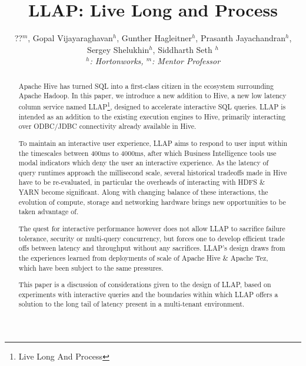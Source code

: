 \documentclass{vldb}
\begin{document}
\title{LLAP: Live Long and Process}

\author{
\alignauthor
??$^m$, Gopal Vijayaraghavan$^h$, Gunther Hagleitner$^h$, Prasanth Jayachandran$^h$, \\ 
Sergey Shelukhin$^h$, Siddharth Seth $^h$
\\
{\large \emph{$^h$: Hortonworks, $^m$: Mentor Professor}}
}

\maketitle

\begin{abstract}
Apache Hive has turned SQL into a first-class citizen in the ecosystem surrounding Apache Hadoop.
In this paper, we introduce a new addition to Hive, a new low latency column service named
LLAP\footnote{Live Long And Process}, designed to accelerate interactive SQL queries. LLAP is intended 
as an addition to the existing execution engines to Hive, primarily interacting over ODBC/JDBC 
connectivity already available in Hive.

To maintain an interactive user experience, LLAP aims to respond to user input within the timescales
between 400ms to 4000ms, after which Business Intelligence tools use modal indicators which deny the 
user an interactive experience. As the latency of query runtimes approach the millisecond scale, 
several historical tradeoffs made in Hive have to be re-evaluated, in particular the overheads of
interacting with HDFS \& YARN become significant. Along with changing balance of these interactions, 
the evolution of compute, storage and networking hardware brings new opportunities to be taken
advantage of.

The quest for interactive performance however does not allow LLAP to sacrifice failure tolerance,
security or multi-query concurrency, but forces one to develop efficient trade offs between latency and 
throughput without any sacrifices. LLAP's design draws from the experiences learned from deployments of
scale of Apache Hive \& Apache Tez, which have been subject to the same pressures.

This paper is a discussion of considerations given to the design of LLAP, based on experiments with
interactive queries and the boundaries within which LLAP offers a solution to the long tail of latency 
present in a multi-tenant environment.

\end{abstract}
\end{document}
